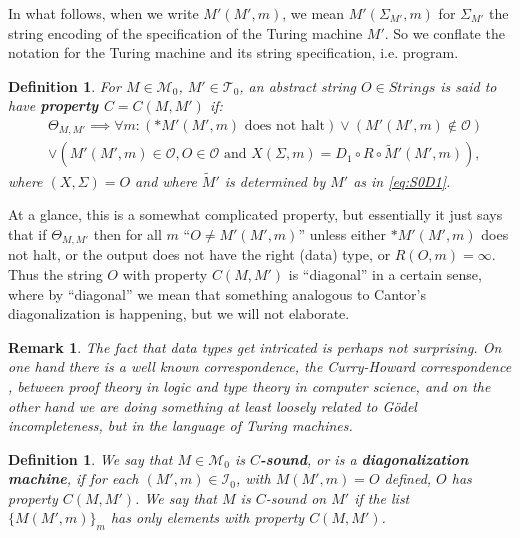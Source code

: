 \documentclass{amsart}  %
\numberwithin{equation}{section}
\newtheorem{remark}[equation]{Remark}
\newtheorem{definition}[equation]{Definition}
\theoremstyle{definition}
\theoremstyle{remark}
\begin{document}
{In what follows, when we write $M' (M', m)$, we mean $M' (\Sigma _{M'},m )$ for $\Sigma _{M'} $ the string encoding of the specification of the Turing machine $M'$. So we conflate the notation for the Turing machine and its string specification, i.e. program.
\begin{definition} \label{def:propertyO} For $M \in \mathcal{M} _{0} $, $M' \in \mathcal{T} _{0} $,  an abstract string $O \in Strings$  is said to have \textbf{\emph{property $C=C (M,M')$}} if: \begin{align*} & \Theta _{M,M'} \implies \forall m: (*M'(M',m) \text{ does not halt} )  \lor (M' (M',m) \notin \mathcal{O}) \\  & \lor ( M' (M',m) \in \mathcal{O},O \in \mathcal{O} \text{ and } X(\Sigma,m) = D_1 \circ R \circ  \widetilde{M}' (M', m)),
\end{align*}
where $(X, \Sigma)=O$
and where $\widetilde{M}'  $ is determined by $M'$ as in \eqref{eq:S0D1}. 
\end {definition} 

   At a glance, this is a somewhat complicated property,  but essentially it just says that if $\Theta _{M,M'} $ then for all $m$  ``$O \neq {M}' (M', m)$'' unless either $*  {M}' (M', m)$ does not halt, or the output does not have the right (data) type, or $R (O,m) = \infty$.  Thus the string $O$ with property $C (M,M')$ is ``diagonal'' in a certain sense, where  by ``diagonal'' we mean that something analogous to Cantor's diagonalization is happening, but we will not elaborate. 
   \begin{remark}
   The fact that data types get intricated is perhaps not surprising. On one hand there is a well known correspondence, the Curry-Howard correspondence \cite{citeCurry}, between proof theory in logic and type theory in computer science, and on the other hand we are doing something at least loosely related to G\"odel incompleteness, but in the language of Turing machines.
\end{remark}
\begin{definition} \label{def:Psound}
   We say that $M \in \mathcal{M} _{0} $ is \textbf{\emph{$C$-sound}}, or 
is a \textbf{\emph{diagonalization machine}}, if for each $(M',m) \in \mathcal{I} _{0} $, with $M (M',m) = O$  defined,  $O$ has property $C (M,M')$.  We say that $M$ is $C$-sound on $M'$ if the list $\{M (M',m)\} _{m} $ has only elements with property $C (M,M')$. 
 \end{definition}



}
\end{document}
